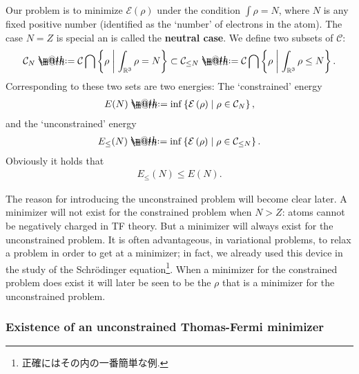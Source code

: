 \documentclass[openany, a4paper, oneside]{jsbook}
\makeatletter
\newcommand*{\defeq}{\mathrel{\rlap{%
\raisebox{0.3ex}{$\m@th\cdot$}}%
\raisebox{-0.3ex}{$\m@th\cdot$}}%
=}
\theoremstyle{break}
\theoremstyle{breakdefn}
\newcommand{\rbk}[1]{\left (#1\right)}
\newcommand{\relmiddle}[1]{\mathrel{}\middle#1\mathrel{}}
\newcommand{\set}[2]{\left\{#1 \relmiddle| #2\right\}}
\newcommand{\bbRthree}{\mathbb{R}^3}
\newcommand{\calC}{\mathcal{C}}
\newcommand{\calCN}{\mathcal{C}_{N}}
\newcommand{\calCleqN}{\mathcal{C}_{\leq N}}
\newcommand{\calE}{\mathcal{E}}
\makeatother
\begin{document}
Our problem is to minimize $\calE (\rho)$ under the condition $\int \rho = N$,
where $N$ is any fixed positive number (identified as the `number' of electrons in the atom).
The case $N=Z$ is special an is called the \textbf{neutral case}.
We define two subsets of $\calC$:
\begin{align}
 \calCN
 \defeq
 \calC \bigcap \set{\rho}{\int_{\bbRthree} \rho = N}
 \subset
 \calCleqN
 \defeq
 \calC \bigcap \set{\rho}{\int_{\bbRthree} \rho \leq N}.
\end{align}
Corresponding to these two sets are two energies: The `constrained' energy
\begin{align}
 E (N)
 \defeq
 \inf \set{\calE \rbk{\rho}}{\rho \in \calCN},
\end{align}
and the `unconstrained' energy
\begin{align}
 E_{\leq}(N)
 \defeq
 \inf \set{\calE \rbk{\rho}}{\rho \in \calCleqN}. \label{Lieb-Loss_Analysis_chap11_18}
\end{align}
Obviously it holds that
\begin{align}
 E_{\leq} (N)
 \leq
 E (N).
\end{align}

The reason for introducing the unconstrained problem will become clear later.
A minimizer will not exist for the constrained problem when $N > Z$:
atoms cannot be negatively charged in TF theory.
But a minimizer will always exist for the unconstrained problem.
It is often advantageous, in variational problems, to relax a problem in order to get at a minimizer;
in fact, we already used this device in the study of the Schr\"odinger equation\footnote{正確にはその内の一番簡単な例.
 }.
When a minimizer for the constrained problem does exist it will later be seen to be the $\rho$ that is
a minimizer for the unconstrained problem.
\subsubsection{Existence of an unconstrained Thomas-Fermi minimizer}
\end{document}
